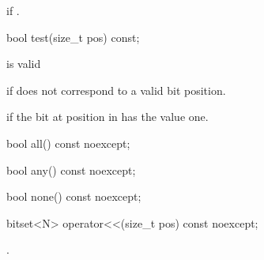 \begin{itemdescr}
\pnum
\returns
{} if
.
\end{itemdescr}

%
\begin{itemdecl}
bool test(size_t pos) const;
\end{itemdecl}

\begin{itemdescr}
\pnum
\requires
{} is valid

\pnum
\throws
{}
if  does not correspond to a valid bit position.%

\pnum
\returns
{}
if the bit at position 
in
has the value one.
\end{itemdescr}

%
\begin{itemdecl}
bool all() const noexcept;
\end{itemdecl}

\begin{itemdescr}
\pnum
\returns {}
\end{itemdescr}

%
\begin{itemdecl}
bool any() const noexcept;
\end{itemdecl}

\begin{itemdescr}
\pnum
\returns {}
\end{itemdescr}

%
\begin{itemdecl}
bool none() const noexcept;
\end{itemdecl}

\begin{itemdescr}
\pnum
\returns {}
\end{itemdescr}

%
\begin{itemdecl}
bitset<N> operator<<(size_t pos) const noexcept;
\end{itemdecl}

\begin{itemdescr}
\pnum
\returns
{}.
\end{itemdescr}


